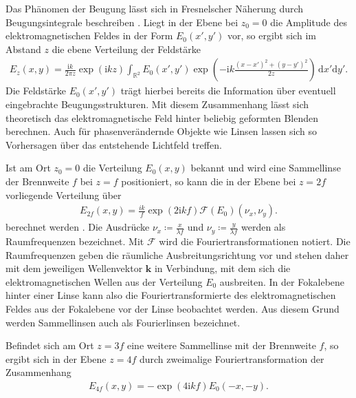 \documentclass[
class=book,
accentcolor=1b,
custommargins=geometry,
fontsize=11pt,
thesis={type=Versuchsanleitung},
ruledheaders=all,
headline=false,
instbox=false,
marginpar=false,
title=small,
ignore-missing-data=true,
twoside=false,
pdfa=false %
]{apqpub}
\begin{document}
Das Phänomen der Beugung lässt sich in Fresnelscher Näherung durch Beugungsintegrale beschreiben \cite{Fourier}.
Liegt in der Ebene bei $z_0 = 0$ die Amplitude des elektromagnetischen Feldes in der Form $E_{0} \!\left( x', y' \right)$ vor, so ergibt sich im Abstand $z$ die ebene Verteilung der Feldstärke
\begin{align*}
E_z \!\left(x, y \right) = 
\frac{\mathrm{i}k}{2 \pi z} \exp\left(\mathrm{i} k z\right) \int_{\mathbb{R}^2} E_{0} \!\left( x', y' \right) \exp \!\left( -\mathrm{i}k \frac{\left( x-x'\right)^2 + \left( y-y'\right)^2}{2 z} \right) \, \mathrm{d} x' \mathrm{d} y'.
\end{align*} 
Die Feldstärke $E_{0} \!\left( x', y' \right)$ trägt hierbei bereits die Information über eventuell eingebrachte Beugungsstrukturen.
Mit diesem Zusammenhang lässt sich theoretisch das elektromagnetische Feld hinter beliebig geformten Blenden berechnen.
Auch für phasenverändernde Objekte wie Linsen lassen sich so Vorhersagen über das entstehende Lichtfeld treffen.

Ist am Ort $z_0 = 0$ die Verteilung $E_{0} \!\left( x, y \right)$ bekannt und wird eine Sammellinse der Brennweite $f$ bei $z = f$ positioniert, so kann die in der Ebene bei $z = 2f$ vorliegende Verteilung über
\begin{align*}
E_{2f} \!\left(x, y \right) = \frac{ik}{f} \exp \!\left( 2\mathrm{i}kf \right) \mathscr{F} \!\left( E_0 \right) \!\left( \nu_x, \nu_y \right).
\end{align*}
berechnet werden \cite{Fourier}.
Die Ausdrücke $ \nu_x \coloneqq \frac{x}{\lambda f}$ und $ \nu_y \coloneqq \frac{y}{\lambda f}$ werden als Raumfrequenzen bezeichnet.
Mit $\mathscr{F}$ wird die Fouriertransformationen notiert.
Die Raumfrequenzen geben die räumliche Ausbreitungsrichtung vor und stehen daher mit dem jeweiligen Wellenvektor $\boldsymbol{k}$ in Verbindung, mit dem sich die elektromagnetischen Wellen aus der Verteilung $E_0$ ausbreiten.
In der Fokalebene hinter einer Linse kann also die Fouriertransformierte des elektromagnetischen Feldes aus der Fokalebene vor der Linse beobachtet werden.
Aus diesem Grund werden Sammellinsen auch als Fourierlinsen bezeichnet.

Befindet sich am Ort $z = 3f$ eine weitere Sammellinse mit der Brennweite $f$, so ergibt sich in der Ebene $z = 4f$ durch zweimalige Fouriertransformation der Zusammenhang
\begin{align*} 
E_{4f}\!\left(x, y \right) = - \exp \!\left( 4\mathrm{i}k f\right) E_0 \!\left( -x , -y \right).
\end{align*}
\end{document}
